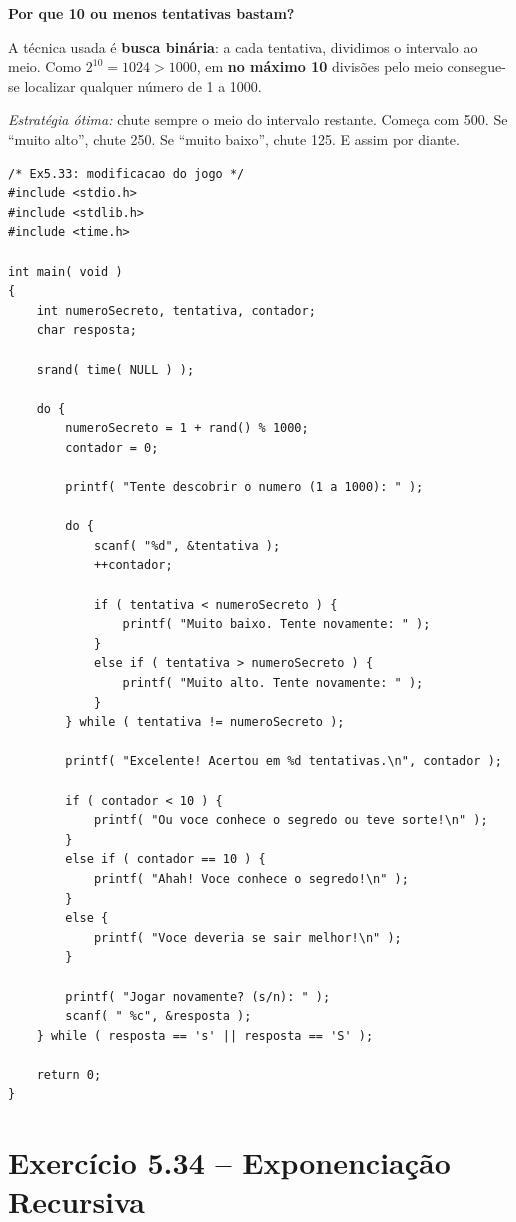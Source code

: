 \documentclass[12pt,a4paper]{article}
\begin{document}
\begin{respostabox}
\textbf{Por que 10 ou menos tentativas bastam?}

A técnica usada é \textbf{busca binária}: a cada tentativa, dividimos o intervalo
ao meio. Como $2^{10} = 1024 > 1000$, em \textbf{no máximo 10} divisões pelo meio
consegue-se localizar qualquer número de 1 a 1000.

\textit{Estratégia ótima:} chute sempre o meio do intervalo restante. Começa com
500. Se ``muito alto'', chute 250. Se ``muito baixo'', chute 125. E assim por diante.

\begin{lstlisting}
/* Ex5.33: modificacao do jogo */
#include <stdio.h>
#include <stdlib.h>
#include <time.h>

int main( void )
{
    int numeroSecreto, tentativa, contador;
    char resposta;

    srand( time( NULL ) );

    do {
        numeroSecreto = 1 + rand() % 1000;
        contador = 0;

        printf( "Tente descobrir o numero (1 a 1000): " );

        do {
            scanf( "%d", &tentativa );
            ++contador;

            if ( tentativa < numeroSecreto ) {
                printf( "Muito baixo. Tente novamente: " );
            }
            else if ( tentativa > numeroSecreto ) {
                printf( "Muito alto. Tente novamente: " );
            }
        } while ( tentativa != numeroSecreto );

        printf( "Excelente! Acertou em %d tentativas.\n", contador );

        if ( contador < 10 ) {
            printf( "Ou voce conhece o segredo ou teve sorte!\n" );
        }
        else if ( contador == 10 ) {
            printf( "Ahah! Voce conhece o segredo!\n" );
        }
        else {
            printf( "Voce deveria se sair melhor!\n" );
        }

        printf( "Jogar novamente? (s/n): " );
        scanf( " %c", &resposta );
    } while ( resposta == 's' || resposta == 'S' );

    return 0;
}
\end{lstlisting}
\end{respostabox}

\newpage

\section{Exercício 5.34 -- Exponenciação Recursiva}
\end{document}
